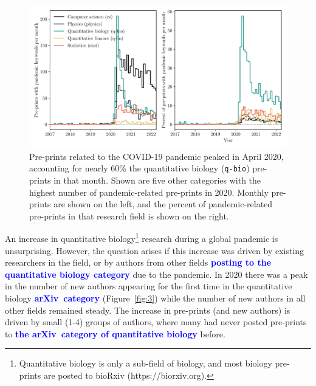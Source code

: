 \documentclass[]{rsos}%
\newcommand{\arxiv}{arXiv}
\newcommand{\change}[1]{\textcolor{blue}{\textbf{#1}}}
\begin{document}
\begin{figure}
 \includegraphics[width=\linewidth]{pandemic-related-preprints}
\caption{Pre-prints related to the COVID-19 pandemic peaked in April 2020, accounting for nearly 60\% the quantitative biology (\texttt{q-bio}) pre-prints in that month. Shown are five other categories with the highest number of pandemic-related pre-prints in 2020. Monthly pre-prints are shown on the left, and the percent of pandemic-related pre-prints in that research field is shown on the right.}
\label{fig:2}
\end{figure}
 
\renewcommand{\thefootnote}{$\dagger$} 
 
An increase in quantitative biology\footnote{Quantitative biology is only a sub-field of biology, and most biology pre-prints are posted to bioRxiv ({https://biorxiv.org}).} research during a global pandemic is unsurprising. However, the question arises if this increase was driven by existing researchers in the field, or by authors from other fields \change{posting to the quantitative biology category} due to the pandemic. In 2020 there was a peak in the number of new authors appearing for the first time in the quantitative biology \change{\arxiv\ category} (Figure~\ref{fig:3}) while the number of new authors in all other fields remained steady. The increase in pre-prints (and new authors) is driven by small (1-4) groups of authors, where many had never posted pre-prints to \change{the \arxiv\ category of quantitative biology} before.
\end{document}
